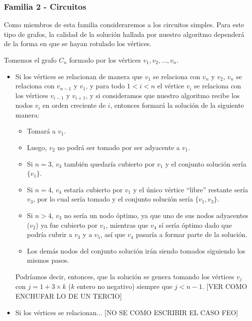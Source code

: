 \subsubsection*{Familia 2 - Circuitos}

Como miembros de esta familia consideraremos a los circuitos simples.  Para este tipo de grafos, la calidad de la solución hallada por nuestro algoritmo dependerá de la forma en que se hayan rotulado los vértices.

Tomemos el grafo $C_{n}$ formado por los vértices $v_1,v_2,...,v_n$.

\begin{itemize}
\item Si los vértices se relacionan de manera que $v_1$ se relaciona con $v_n$ y $v_2$, $v_n$ se relaciona con $v_{n-1}$ y $v_1$, y para todo $1 < i < n$ el vértice $v_i$ se relaciona con los vértices $v_{i-1}$ y $v_{i+1}$, y si consideramos que nuestro algoritmo recibe los nodos $v_i$ en orden creciente de $i$, entonces formará la solución de la siguiente manera:

	\begin{itemize}
	\item Tomará a $v_1$.
	\item Luego, $v_2$ no podrá ser tomado por ser adyacente a $v_1$.
	\item Si $n = 3$, $v_3$ también quedaría cubierto por $v_1$ y el conjunto solución sería $\{v_1\}$.  
	\item Si $n = 4$, $v_4$ estaría cubierto por $v_1$ y el único vértice ``libre'' restante sería $v_3$, por lo cual sería tomado y el conjunto solución sería $\{v_1,v_3\}$.
	\item Si $n > 4$, $v_3$ no sería un nodo óptimo, ya que uno de sus nodos adyacentes ($v_2$) ya fue cubierto por $v_1$, mientras que $v_4$ sí sería óptimo dado que podría cubrir a $v_3$ y a $v_5$, así que $v_4$ pasaría a formar parte de la solución.
	\item Los demás nodos del conjunto solución irán siendo tomados siguiendo los mismos pasos.
	\end{itemize}
	
	Podríamos decir, entonces, que la solución se genera tomando los vértices $v_j$ con $j = 1 + 3 \times k$ ($k$ entero no negativo) siempre que $j < n-1$. [VER COMO ENCHUFAR LO DE UN TERCIO]
	
\item Si los vértices se relacionan... [NO SE COMO ESCRIBIR EL CASO FEO]
\end{itemize}

